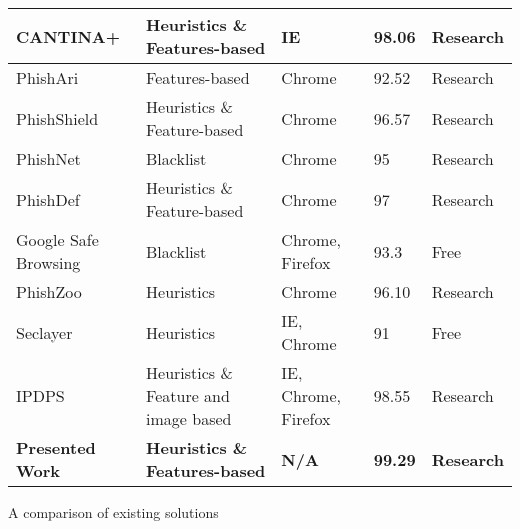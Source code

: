 \begin{singlespace}
\begin{center}
\begin{tabular}{ | m{8em} | m{13em} | m{8.5em} | m{2.3em} | m{5em} | }
            CANTINA+                     & Heuristics \& Features-based          & IE                  & 98.06           & Research               \\
            \hline
            PhishAri                     & Features-based                        & Chrome              & 92.52           & Research               \\
            \hline
            PhishShield                  & Heuristics \& Feature-based           & Chrome              & 96.57           & Research               \\
            \hline
            PhishNet                     & Blacklist                             & Chrome              & 95              & Research               \\
            \hline
            PhishDef                     & Heuristics \& Feature-based           & Chrome              & 97              & Research               \\
            \hline
            Google Safe Browsing         & Blacklist                             & Chrome, Firefox     & 93.3            & Free                   \\
            \hline
            PhishZoo                     & Heuristics                            & Chrome              & 96.10           & Research               \\
            \hline
            Seclayer                     & Heuristics                            & IE, Chrome          & 91              & Free                   \\
            \hline
            IPDPS                        & Heuristics \& Feature and image based & IE, Chrome, Firefox & 98.55           & Research               \\
            \hline
            \textbf{Presented Work}      & \textbf{Heuristics \& Features-based} & \textbf{N/A}        & \textbf{99.29}  & \textbf{Research}      \\
            \hline
        \end{tabular}
        \captionsetup{type=table}\caption{A comparison of existing solutions \citep{INTELLIGENT_PHISHING_ANFIS}}
    \end{center}
\end{singlespace}